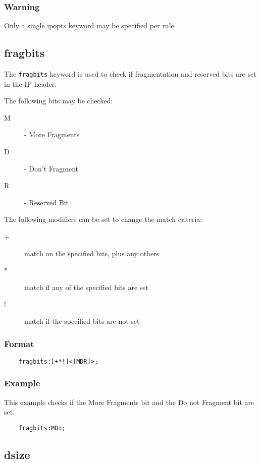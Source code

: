 \documentclass[english]{report}
\begin{document}
\subsubsection{Warning}

Only a single ipopts keyword may be specified per rule.

\subsection{fragbits}

The \texttt{fragbits} keyword is used to check if fragmentation and reserved
bits are set in the IP header.

The following bits may be checked:

\begin{description}
\item [M] - More Fragments
\item [D] - Don't Fragment
\item [R] - Reserved Bit
\end{description}

The following modifiers can be set to change the match criteria:

\begin{description}
\item [+] match on the specified bits, plus any others
\item [*] match if any of the specified bits are set
\item [!] match if the specified bits are not set
\end{description}

\subsubsection{Format}

\begin{verbatim}
    fragbits:[+*!]<[MDR]>;
\end{verbatim}

\subsubsection{Example}

This example checks if the More Fragments bit and the Do not Fragment bit are
set.

\begin{verbatim}
    fragbits:MD+;
\end{verbatim}

\subsection{dsize}
\end{document}
